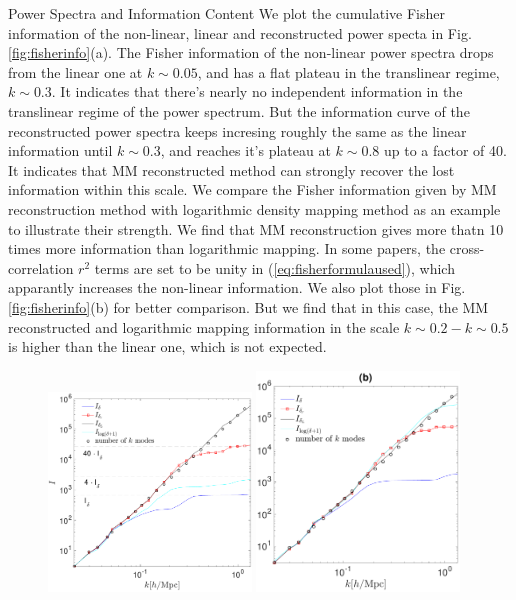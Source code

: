 \begin{section}{Power Spectra and Information Content}
  We plot the 
cumulative Fisher information of the non-linear, linear and reconstructed power specta in 
Fig.\ref{fig:fisherinfo}(a). The Fisher information of the non-linear power spectra drops 
from the linear one at $k \sim 0.05$, and has a flat plateau in the translinear regime, $k\sim0.3$. It 
indicates that there's nearly no independent information in the translinear regime of the power 
spectrum.
But the information curve of 
the reconstructed power spectra keeps incresing roughly the same as 
the linear information until $k\sim0.3$, and reaches it's plateau at $k\sim0.8$ 
up to a factor of 40. It indicates that MM reconstructed method can strongly recover the lost information 
within this scale. We compare the Fisher information given by MM reconstruction method with 
logarithmic density mapping method \cite{bib:Mark2009} as an example to illustrate their strength. 
We find that MM reconstruction gives more thatn 10 times more information than logarithmic mapping. 
In some papers, the cross-correlation $r^2$ terms are set to be unity in (\ref{eq:fisherformulaused}), which 
apparantly increases the non-linear information. We also plot those in Fig. \ref{fig:fisherinfo}(b) 
for better comparison. But we find that in this case, the MM reconstructed and logarithmic mapping information in the scale 
$k \sim 0.2 - k \sim 0.5$ is higher than the linear one, which is not expected. 
\begin{figure}[t!]
  \includegraphics[width=0.48\textwidth]{fisher_addlog_r2_analysis-crop.pdf}
  \includegraphics[width=0.48\textwidth]{fisher_addlog-crop.pdf}

\end{figure}
\end{section}
